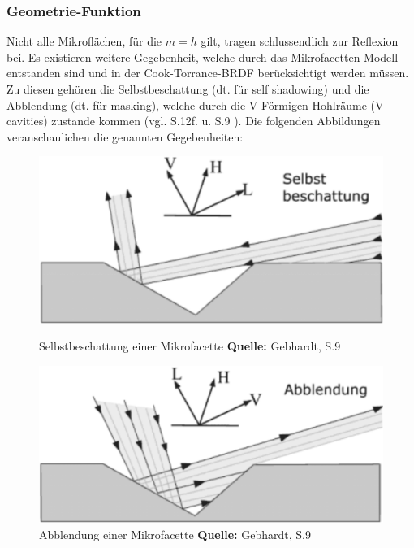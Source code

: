 \documentclass[
  11pt,
  a4paper,
  oneside
  ]{article}
\begin{document}
\subsubsection{Geometrie-Funktion}
Nicht alle Mikroflächen, für die $m = h$ gilt, tragen schlussendlich zur Reflexion bei. Es existieren weitere Gegebenheit, welche durch das Mikrofacetten-Modell entstanden sind und in der Cook-Torrance-BRDF berücksichtigt werden müssen. Zu diesen gehören die Selbstbeschattung (dt. für self shadowing) und die Abblendung (dt. für masking), welche durch die V-Förmigen Hohlräume (V-cavities) zustande kommen 
(vgl. S.12f. \cite{rtrPaper} u. S.9 \cite{irrlichtOrg}). Die folgenden Abbildungen veranschaulichen die genannten Gegebenheiten: 
\begin{figure}[H]
  \centering
  \begin{minipage}{.48\textwidth}
    \centering
    \includegraphics*[width=1\linewidth]{images/selstbeschattung.png}
    \caption{Selbstbeschattung einer Mikrofacette \footnotesize\textbf{Quelle:} Gebhardt, S.9  \cite{irrlichtOrg}}
    \label{fig:img8}
  \end{minipage}%
  \hfill
  \begin{minipage}{.48\textwidth}
    \centering
    \includegraphics*[width=1\linewidth]{images/abblendung.png}
    \caption{Abblendung einer Mikrofacette \footnotesize\textbf{Quelle:} Gebhardt, S.9 \cite{irrlichtOrg}}
    \label{fig:img9}
  \end{minipage}
\end{figure}
\end{document}
